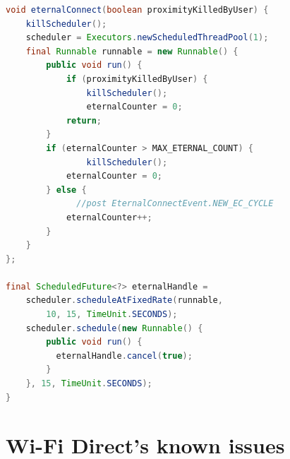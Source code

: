 \begin{lstlisting}[caption={eternalConnect() method},label=eternalConnect, language=Java]
void eternalConnect(boolean proximityKilledByUser) {
	killScheduler();
    scheduler = Executors.newScheduledThreadPool(1);
    final Runnable runnable = new Runnable() {
    	public void run() {
        	if (proximityKilledByUser) {
        		killScheduler();
        		eternalCounter = 0;
            return;
        }	
		if (eternalCounter > MAX_ETERNAL_COUNT) {
        		killScheduler();
            eternalCounter = 0;
        } else {
        	  //post EternalConnectEvent.NEW_EC_CYCLE
            eternalCounter++;
        }
	}
};

final ScheduledFuture<?> eternalHandle =
	scheduler.scheduleAtFixedRate(runnable, 
		10, 15, TimeUnit.SECONDS);
    scheduler.schedule(new Runnable() {
    	public void run() {
          eternalHandle.cancel(true);
        }
    }, 15, TimeUnit.SECONDS);
}
\end{lstlisting}


\section{Wi-Fi Direct's known issues}

